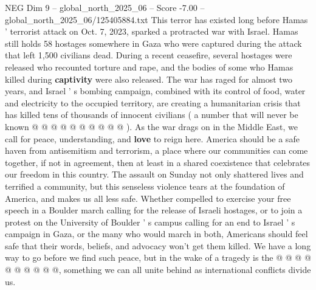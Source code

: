 \begin{textsample}{NEG Dim 9 – global\_north\_2025\_06 – Score -7.00 – global\_north\_2025\_06/125405884.txt}
This terror has existed long before Hamas ' terrorist attack on Oct. 7, 2023, sparked a protracted war with Israel.
Hamas still holds 58 hostages somewhere in Gaza who were captured during the attack that left 1,500 civilians dead.
During a recent ceasefire, several hostages were released who recounted torture and rape, and the bodies of some who Hamas killed during \textbf{captivity} were also released.
The war has raged for almost two years, and Israel ' s bombing campaign, combined with its control of food, water and electricity to the occupied territory, are creating a humanitarian crisis that has killed tens of thousands of innocent civilians ( a number that will never be known @ @ @ @ @ @ @ @ @ @ ).
As the war drags on in the Middle East, we call for peace, understanding, and \textbf{love} to reign here.
America should be a safe haven from antisemitism and terrorism, a place where our communities can come together, if not in agreement, then at least in a shared coexistence that celebrates our freedom in this country.
The assault on Sunday not only shattered lives and terrified a community, but this senseless violence tears at the foundation of America, and makes us all less safe.
Whether compelled to exercise your free speech in a Boulder march calling for the release of Israeli hostages, or to join a protest on the University of Boulder ' s campus calling for an end to Israel ' s campaign in Gaza, or the many who would march in both, Americans should feel safe that their words, beliefs, and advocacy won't get them killed.
We have a long way to go before we find such peace, but in the wake of a tragedy is the @ @ @ @ @ @ @ @ @ @, something we can all unite behind as international conflicts divide us.

\end{textsample}
